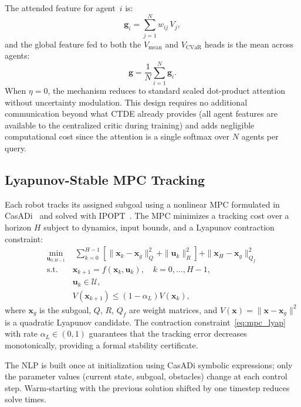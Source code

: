 \documentclass[letterpaper]{IEEEtran}
\newcommand{\vmean}{V_{\text{mean}}}
\newcommand{\vcvar}{V_{\text{CVaR}}}
\newcommand{\xbf}{\mathbf{x}}
\newcommand{\ubf}{\mathbf{u}}
\begin{document}
The attended feature for agent~$i$ is:
\begin{equation}
\mathbf{g}_i = \textstyle\sum_{j=1}^{N} w_{ij} \, V_j,
\label{eq:attended_per_agent}
\end{equation}
and the global feature fed to both the $\vmean$ and $\vcvar$ heads is the mean across agents:
\begin{equation}
\mathbf{g} = \frac{1}{N} \textstyle\sum_{i=1}^{N} \mathbf{g}_i.
\label{eq:attended}
\end{equation}
When $\eta = 0$, the mechanism reduces to standard scaled dot-product attention without uncertainty modulation. This design requires no additional communication beyond what CTDE already provides (all agent features are available to the centralized critic during training) and adds negligible computational cost since the attention is a single softmax over $N$ agents per query.

\subsection{Lyapunov-Stable MPC Tracking}
\label{sec:mpc}

Each robot tracks its assigned subgoal using a nonlinear MPC formulated in CasADi~\cite{andersson2019casadi} and solved with IPOPT~\cite{wachter2006ipopt}. The MPC minimizes a tracking cost over a horizon $H$ subject to dynamics, input bounds, and a Lyapunov contraction constraint:
\begin{subequations}
\label{eq:mpc}
\begin{align}
\min_{\ubf_{0:H-1}} &\; \sum_{k=0}^{H-1} \left[\|\xbf_k - \xbf_g\|_Q^2 + \|\ubf_k\|_R^2\right] + \|\xbf_H - \xbf_g\|_{Q_f}^2 \label{eq:mpc_cost} \\
\text{s.t.} \quad & \xbf_{k+1} = f(\xbf_k, \ubf_k), \quad k = 0, \dots, H{-}1, \label{eq:mpc_dyn} \\
& \ubf_k \in \mathcal{U}, \label{eq:mpc_input} \\
& V(\xbf_{k+1}) \leq (1 - \alpha_L) V(\xbf_k), \label{eq:mpc_lyap}
\end{align}
\end{subequations}
where $\xbf_g$ is the subgoal, $Q$, $R$, $Q_f$ are weight matrices, and $V(\xbf) = \|\xbf - \xbf_g\|^2$ is a quadratic Lyapunov candidate. The contraction constraint~\eqref{eq:mpc_lyap} with rate $\alpha_L \in (0, 1)$ guarantees that the tracking error decreases monotonically, providing a formal stability certificate.

The NLP is built once at initialization using CasADi symbolic expressions; only the parameter values (current state, subgoal, obstacles) change at each control step. Warm-starting with the previous solution shifted by one timestep reduces solve times.
\end{document}
